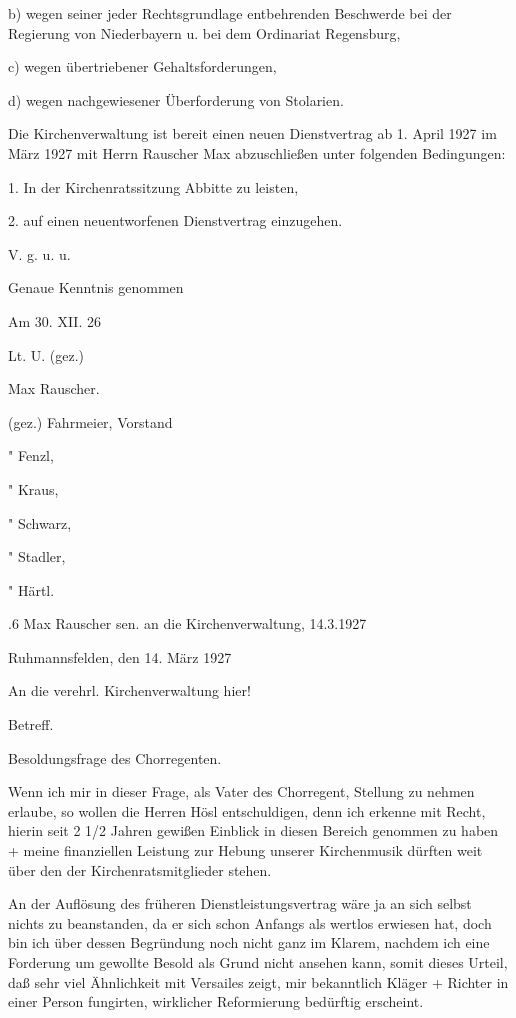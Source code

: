b) wegen seiner jeder Rechtsgrundlage entbehrenden Beschwerde bei der Regierung
von Niederbayern u. bei dem Ordinariat Regensburg,

c) wegen übertriebener Gehaltsforderungen,

d) wegen nachgewiesener Überforderung von Stolarien.

Die Kirchenverwaltung ist bereit einen neuen Dienstvertrag ab 1. April 1927 im
März 1927 mit Herrn Rauscher Max abzuschließen unter folgenden Bedingungen:

1. In der Kirchenratssitzung Abbitte zu leisten,

2. auf einen neuentworfenen Dienstvertrag einzugehen.

V. g. u. u.



Genaue Kenntnis genommen

Am 30. XII. 26

Lt. U. (gez.)

Max Rauscher.



(gez.) Fahrmeier, Vorstand

   "     Fenzl,

   "     Kraus,

   "     Schwarz,

   "     Stadler,

   "     Härtl.

.6 Max Rauscher sen. an die Kirchenverwaltung, 14.3.1927

Ruhmannsfelden, den 14. März 1927



An die verehrl. Kirchenverwaltung hier!



Betreff.

Besoldungsfrage des Chorregenten.



Wenn ich mir in dieser Frage, als Vater des Chorregent, Stellung zu nehmen
erlaube, so wollen die Herren Hösl entschuldigen, denn ich erkenne mit Recht,
hierin seit 2 1/2 Jahren gewißen Einblick in diesen Bereich genommen zu haben +
meine finanziellen Leistung zur Hebung unserer Kirchenmusik dürften weit über
den der Kirchenratsmitglieder stehen.

An der Auflösung des früheren Dienstleistungsvertrag wäre ja an sich selbst
nichts zu beanstanden, da er sich schon Anfangs als wertlos erwiesen hat, doch
bin ich über dessen Begründung noch nicht ganz im Klarem, nachdem ich eine
Forderung um gewollte Besold als Grund nicht ansehen kann, somit dieses Urteil,
daß sehr viel Ähnlichkeit mit Versailes zeigt, mir bekanntlich Kläger + Richter
in einer Person fungirten, wirklicher Reformierung bedürftig erscheint.

